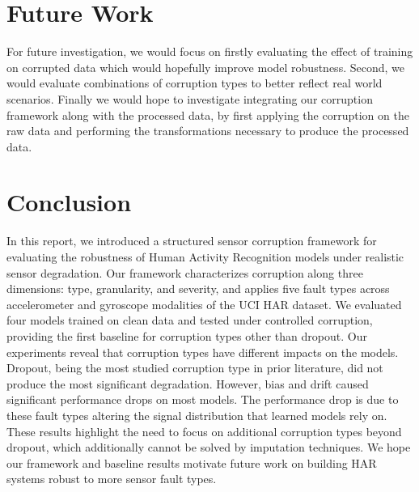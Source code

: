 \section{Future Work}
For future investigation, we would focus on firstly evaluating the effect of training on corrupted
data which would hopefully improve model robustness. Second, we would evaluate combinations
of corruption types to better reflect real world scenarios. Finally we would hope to investigate
integrating our corruption framework along with the processed data, by first applying the
corruption on the raw data and performing the transformations necessary to produce the processed
data.

\section{Conclusion}
In this report, we introduced a structured sensor corruption framework for evaluating the
robustness of Human Activity Recognition models under realistic sensor degradation. Our framework
characterizes corruption along three dimensions: type, granularity, and severity, and applies
five fault types across accelerometer and gyroscope modalities of the UCI HAR dataset. We evaluated
four models trained on clean data and tested under controlled corruption, providing the first
baseline for corruption types other than dropout.
Our experiments reveal that corruption types have different impacts on the models. Dropout, being
the most studied corruption type in prior literature, did not produce the most significant
degradation. However, bias and drift caused significant performance drops on most models. The
performance drop is due to these fault types altering the signal distribution that learned models
rely on.
These results highlight the need to focus on additional corruption types beyond dropout, which
additionally cannot be solved by imputation techniques. We hope our framework and baseline results
motivate future work on building HAR systems robust to more sensor fault types.
